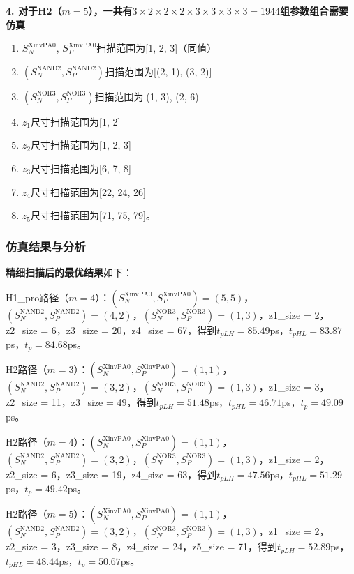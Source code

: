 \documentclass[UTF8,12pt,a4paper]{ctexart}
\begin{document}
\textbf{4. 对于H2（$m = 5$），一共有$3\times2\times2\times2\times3\times3\times3\times3=1944$组参数组合需要仿真}
\begin{enumerate}
    \item $S_N^{\text{XinvPA0}}$, $S_P^{\text{XinvPA0}}$扫描范围为[1, 2, 3]（同值）
    \item $(S_N^{\text{NAND2}}, S_P^{\text{NAND2}})$扫描范围为[(2, 1), (3, 2)]
    \item $(S_N^{\text{NOR3}}, S_P^{\text{NOR3}})$扫描范围为[(1, 3), (2, 6)]
    \item $z_1$尺寸扫描范围为[1, 2]
    \item $z_2$尺寸扫描范围为[1, 2, 3]
    \item $z_3$尺寸扫描范围为[6, 7, 8]
    \item $z_4$尺寸扫描范围为[22, 24, 26]
    \item $z_5$尺寸扫描范围为[71, 75, 79]。
\end{enumerate}

\subsubsection{仿真结果与分析}

\textbf{精细扫描后的最优结果}如下：

H1\_pro路径（$m = 4$）：$(S_N^{\text{XinvPA0}}, S_P^{\text{XinvPA0}}) = (5, 5)$，$(S_N^{\text{NAND2}}, S_P^{\text{NAND2}}) = (4, 2)$，$(S_N^{\text{NOR3}}, S_P^{\text{NOR3}}) = (1, 3)$，z1\_size = 2，z2\_size = 6，z3\_size = 20，z4\_size = 67，得到$t_{pLH} = 85.49$ps，$t_{pHL} = 83.87$ps，$t_p = 84.68$ps。

H2路径（$m = 3$）：$(S_N^{\text{XinvPA0}}, S_P^{\text{XinvPA0}}) = (1, 1)$，$(S_N^{\text{NAND2}}, S_P^{\text{NAND2}}) = (3, 2)$，$(S_N^{\text{NOR3}}, S_P^{\text{NOR3}}) = (1, 3)$，z1\_size = 3，z2\_size = 11，z3\_size = 49，得到$t_{pLH} = 51.48$ps，$t_{pHL} = 46.71$ps，$t_p = 49.09$ps。

H2路径（$m = 4$）：$(S_N^{\text{XinvPA0}}, S_P^{\text{XinvPA0}}) = (1, 1)$，$(S_N^{\text{NAND2}}, S_P^{\text{NAND2}}) = (3, 2)$，$(S_N^{\text{NOR3}}, S_P^{\text{NOR3}}) = (1, 3)$，z1\_size = 2，z2\_size = 6，z3\_size = 19，z4\_size = 63，得到$t_{pLH} = 47.56$ps，$t_{pHL} = 51.29$ps，$t_p = 49.42$ps。

H2路径（$m = 5$）：$(S_N^{\text{XinvPA0}}, S_P^{\text{XinvPA0}}) = (1, 1)$，$(S_N^{\text{NAND2}}, S_P^{\text{NAND2}}) = (3, 2)$，$(S_N^{\text{NOR3}}, S_P^{\text{NOR3}}) = (1, 3)$，z1\_size = 2，z2\_size = 3，z3\_size = 8，z4\_size = 24，z5\_size = 71，得到$t_{pLH} = 52.89$ps，$t_{pHL} = 48.44$ps，$t_p = 50.67$ps。
\end{document}

